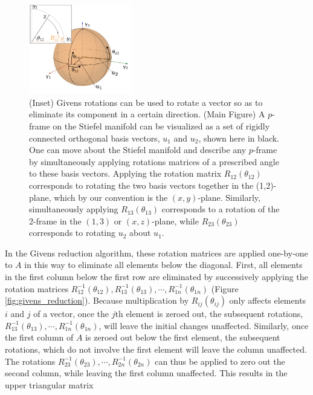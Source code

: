\documentclass[ba]{imsart}
\numberwithin{equation}{section}
\theoremstyle{plain}
\begin{document}
\begin{figure}[h]
\centering
\vspace{.1in}
\includegraphics[width=0.4\textwidth]{figures/stiefel_geom_new.png}
\vspace{.05in}
\caption{(Inset) Givens rotations can be used to rotate a vector so as to eliminate its component in a certain direction. (Main Figure) A $p$-frame on the Stiefel manifold can be visualized as a set of rigidly connected orthogonal basis vectors, $u_1$ and $u_2$, shown here in black. One can move about the Stiefel manifold and describe any $p$-frame by simultaneously applying rotations matrices of a prescribed angle to these basis vectors. Applying the rotation matrix $R_{12}(\theta_{12})$ corresponds to rotating the two basis vectors together in the (1,2)-plane, which by our convention is the $(x,y)$-plane. Similarly, simultaneously applying $R_{13}(\theta_{13})$ corresponds to a rotation of the 2-frame in the $(1,3)$ or $(x,z)$-plane, while $R_{23}(\theta_{23})$ corresponds to rotating $u_2$ about $u_1$.}
\label{fig:StiefelGeom}
\end{figure}

\noindent In the Givens reduction algorithm, these rotation matrices are applied one-by-one to $A$ in this way to eliminate all elements below the diagonal. First, all elements in the first column below the first row are eliminated by successively applying the rotation matrices $R_{12}^{-1}(\theta_{12}), R_{13}^{-1}(\theta_{13}), \cdots, R_{1n}^{-1}(\theta_{1n})$  (Figure \ref{fig:givens_reduction}). Because multiplication by $R_{ij}(\theta_{ij})$ only affects elements $i$ and $j$ of a vector, once the $j$th element is zeroed out, the subsequent rotations, $R_{13}^{-1}(\theta_{13}), \cdots, R_{1n}^{-1}(\theta_{1n})$, will leave the initial changes unaffected. Similarly, once the first column of $A$ is zeroed out below the first element, the subsequent rotations, which do not involve the first element will leave the column unaffected. The rotations  $R_{23}^{-1}(\theta_{23}), \cdots, R_{2n}^{-1}(\theta_{2n})$ can thus be applied to zero out the second column, while leaving the first column unaffected. This results in the upper triangular matrix
\end{document}

